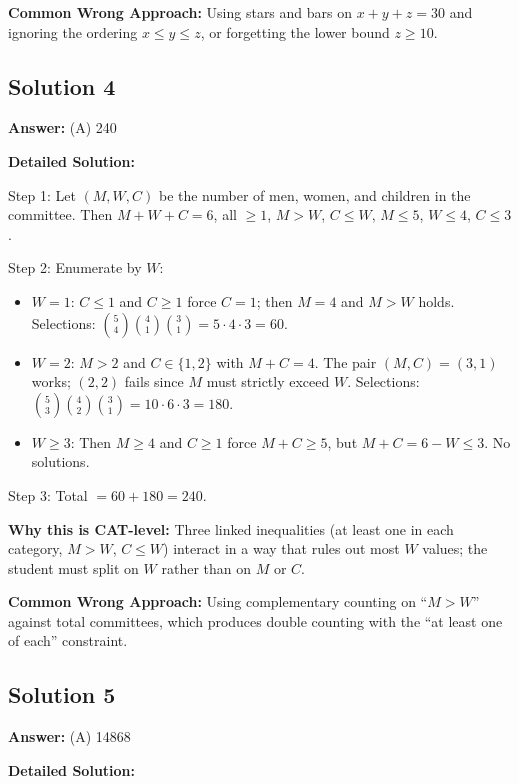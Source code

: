 \documentclass[11pt,a4paper]{article}
\begin{document}
\textbf{Common Wrong Approach:} Using stars and bars on \(x + y + z = 30\) and ignoring the ordering \(x \leq y \leq z\), or forgetting the lower bound \(z \geq 10\).

\subsection*{Solution 4}
\textbf{Answer:} (A) 240

\textbf{Detailed Solution:}

Step 1: Let \((M, W, C)\) be the number of men, women, and children in the committee. Then \(M + W + C = 6\), all \(\geq 1\), \(M > W\), \(C \leq W\), \(M \leq 5\), \(W \leq 4\), \(C \leq 3\).

Step 2: Enumerate by \(W\):
\begin{itemize}[leftmargin=*,topsep=0pt,itemsep=0pt]
    \item \(W = 1\): \(C \leq 1\) and \(C \geq 1\) force \(C = 1\); then \(M = 4\) and \(M > W\) holds. Selections: \(\binom{5}{4}\binom{4}{1}\binom{3}{1} = 5 \cdot 4 \cdot 3 = 60\).
    \item \(W = 2\): \(M > 2\) and \(C \in \{1, 2\}\) with \(M + C = 4\). The pair \((M, C) = (3, 1)\) works; \((2, 2)\) fails since \(M\) must strictly exceed \(W\). Selections: \(\binom{5}{3}\binom{4}{2}\binom{3}{1} = 10 \cdot 6 \cdot 3 = 180\).
    \item \(W \geq 3\): Then \(M \geq 4\) and \(C \geq 1\) force \(M + C \geq 5\), but \(M + C = 6 - W \leq 3\). No solutions.
\end{itemize}

Step 3: Total \(= 60 + 180 = 240\).

\textbf{Why this is CAT-level:} Three linked inequalities (at least one in each category, \(M > W\), \(C \leq W\)) interact in a way that rules out most \(W\) values; the student must split on \(W\) rather than on \(M\) or \(C\).

\textbf{Common Wrong Approach:} Using complementary counting on ``\(M > W\)'' against total committees, which produces double counting with the ``at least one of each'' constraint.

\subsection*{Solution 5}
\textbf{Answer:} (A) 14868

\textbf{Detailed Solution:}
\end{document}
